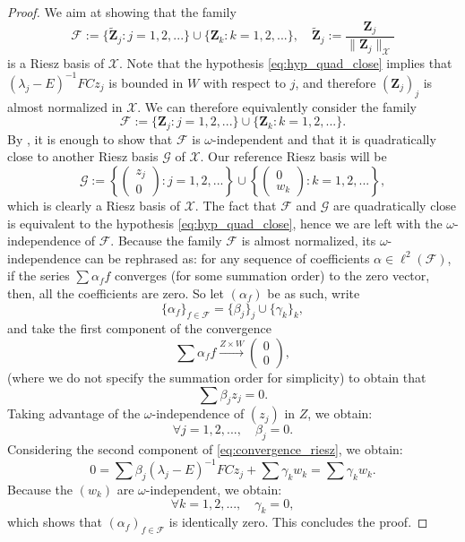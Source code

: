 \documentclass[10pt]{article}
\begin{document}
\begin{proof}
We aim at showing that the family 
\[
\mathcal{F} := \lbrace \tilde{\mathbf{Z}}_j : j = 1,2,... \rbrace \cup \lbrace \mathbf{Z}_k : k = 1,2,... \rbrace,\quad \tilde{\mathbf{Z}}_j := \frac{\mathbf{Z}_j}{\|\mathbf{Z}_j\|_\mathcal{X}}
\]
is a Riesz basis of $\mathcal{X}$. Note that the hypothesis \eqref{eq:hyp_quad_close} implies that $(\lambda_j - E)^{-1}FCz_j$ is bounded in $W$ with respect to $j$, and therefore $(\mathbf{Z}_j)_j$ is almost normalized in $\mathcal{X}$. We can therefore equivalently consider the family 
\[
\mathcal{F} := \lbrace \mathbf{Z}_j : j = 1,2,... \rbrace \cup \lbrace \mathbf{Z}_k : k =1,2,... \rbrace.
\]
By \cite[Chapter 6, Theorem 2.3]{intro_non_selfadj}, it is enough to show that $\mathcal{F}$ is $\omega$-independent and that it is quadratically close to another Riesz basis $\mathcal{G}$ of $\mathcal{X}$. Our reference Riesz basis will be 
\[
\mathcal{G} := \left\lbrace \left( \begin{array}{c}
z_j \\
0
\end{array} \right) : j = 1,2,... \right\rbrace \cup \left\lbrace \left( \begin{array}{c}
0 \\
w_k
\end{array} \right) : k = 1,2,... \right\rbrace,
\]
which is clearly a Riesz basis of $\mathcal{X}$. The fact that $\mathcal{F}$ and $\mathcal{G}$ are quadratically close is equivalent to the hypothesis \eqref{eq:hyp_quad_close}, hence we are left with the $\omega$-independence of $\mathcal{F}$. Because the family $\mathcal{F}$ is almost normalized, its $\omega$-independence can be rephrased as: for any sequence of coefficients $\alpha \in \ell^2(\mathcal{F})$, if the series $\sum \alpha_f f$ converges (for some summation order) to the zero vector, then, all the coefficients are zero. So let $(\alpha_f)$ be as such, write 
\[
\{\alpha_f\}_{f \in \mathcal{F}} = \{\beta_j\}_j \cup \{\gamma_k\}_k,
\]
and take the first component of the convergence 
\begin{equation}\label{eq:convergence_riesz}
    \sum \alpha_f f \xrightarrow[]{Z \times W} \left( \begin{array}{c}
0 \\
0  
\end{array} \right),
\end{equation}
(where we do not specify the summation order for simplicity) to obtain that 
\[
\sum \beta_j z_j = 0.
\]
Taking advantage of the $\omega$-independence of $(z_j)$ in $Z$, we obtain:
\[
\forall j = 1,2,...,\quad \beta_j = 0.
\]
Considering the second component of \eqref{eq:convergence_riesz}, we obtain:
\[
0 = \sum \beta_j (\lambda_j-E)^{-1}FCz_j  + \sum \gamma_k w_k = \sum \gamma_k w_k.
\]
Because the $(w_k)$ are $\omega$-independent, we obtain: 
\[
\forall k = 1,2,...,\quad \gamma_k = 0,
\]
which shows that $(\alpha_f)_{f \in \mathcal{F}}$ is identically zero. This concludes the proof. 
\end{proof}
\end{document}
